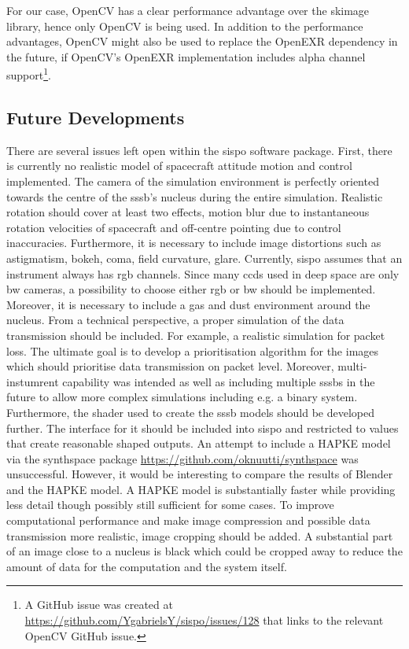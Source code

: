 For our case, OpenCV has a clear performance advantage over the \gls{skimage} library, hence only OpenCV is being used. In addition to the performance advantages, OpenCV might also be used to replace the OpenEXR dependency in the future, if OpenCV's OpenEXR implementation includes alpha channel support\footnote{A GitHub issue was created at \url{https://github.com/YgabrielsY/sispo/issues/128} that links to the relevant OpenCV GitHub issue.}.

\subsection{Future Developments}
There are several issues left open within the \gls{sispo} software package. First, there is currently no realistic model of spacecraft attitude motion and control implemented. The camera of the simulation environment is perfectly oriented towards the centre of the \gls{sssb}'s nucleus during the entire simulation. Realistic rotation should cover at least two effects, motion blur due to instantaneous rotation velocities of spacecraft and off-centre pointing due to control inaccuracies. Furthermore, it is necessary to include  image distortions such as astigmatism, bokeh, coma, field curvature, glare.
Currently, \gls{sispo} assumes that an instrument always has \gls{rgb} channels. Since many \gls{ccd}s used in deep space are only \gls{bw} cameras, a possibility to choose either \gls{rgb} or \gls{bw} should be implemented.
Moreover, it is necessary to include a gas and dust environment around the nucleus. From a technical perspective, a proper simulation of the data transmission should be included. For example, a realistic simulation for packet loss. The ultimate goal is to develop a prioritisation algorithm for the images which should prioritise data transmission on packet level.
Moreover, multi-instumrent capability was intended as well as including multiple \gls{sssb}s in the future to allow more complex simulations including e.g. a binary system.
Furthermore, the shader used to create the \gls{sssb} models should be developed further. The interface for it should be included into \gls{sispo} and restricted to values that create reasonable shaped outputs.
An attempt to include a HAPKE model via the synthspace package \url{https://github.com/oknuutti/synthspace} was unsuccessful. However, it would be interesting to compare the results of Blender and the HAPKE model. A HAPKE model is substantially faster while providing less detail though possibly still sufficient for some cases.
To improve computational performance and make image compression and possible data transmission more realistic, image cropping should be added. A substantial part of an image close to a nucleus is black which could be cropped away to reduce the amount of data for the computation and the system itself.

